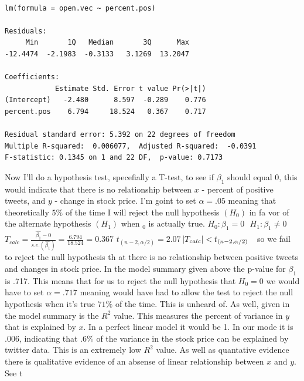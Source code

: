 \documentclass{acm_proc_article-sp}
\begin{document}
\begin{verbatim} 

lm(formula = open.vec ~ percent.pos)

Residuals:
     Min       1Q   Median       3Q      Max 
-12.4474  -2.1983  -0.3133   3.1269  13.2047 

Coefficients:
            Estimate Std. Error t value Pr(>|t|)
(Intercept)   -2.480      8.597  -0.289    0.776
percent.pos    6.794     18.524   0.367    0.717

Residual standard error: 5.392 on 22 degrees of freedom
Multiple R-squared:  0.006077,  Adjusted R-squared:  -0.0391 
F-statistic: 0.1345 on 1 and 22 DF,  p-value: 0.7173

\end{verbatim}

\indent Now I'll do a hypothesis test, specefially a T-test, to see if $\beta_1$ should equal 0, this would indicate
 that there is no relationship between $x$ - percent of positive tweets, and $y$ - change in stock price. I'm goint 
to set $\alpha = .05$ meaning that theoretically $5 \%$ of the time I will reject the null hypothesis $ (H_0)$ in fa
vor of the alternate hypothesis $(H_1)$ when $ _0$ is actually true. 
\newline\indent $ H_0: \beta_1 = 0 \ \ \ H_1: \beta_1 \neq 0$
\newline\indent\large $T_{calc} = \frac{ \hat{\beta_1} - 0 }{s.e.(\hat{\beta_1})} = \frac{6.794}{18.524} = 0.367 $
\newline\indent $ t_{ (n-2,\alpha/2)} = 2.07$
\newline\indent $ \abs{T_{calc}} < t_{ (n-2,\alpha/2)} \ \ $ \normalsize so we fail to reject the null hypothesis th
at there is no relationship between positive tweets and changes in stock price.
\newline\indent In the model summary given above the p-value for $\beta_1$ is .717. This means that for us to reject
 the null hypothesis that $H_0 =0$ we would have to set $\alpha = .717$ meaning would have had to allow the test to 
reject the null hypothesis when it's true $71 \%$ of the time. This is unheard of.
\newline\indent As well, given in the model summary is the $R^2$ value. This measures the percent of variance in $y$
 that is explained by $x$. In a perfect linear model it would be 1. In our mode it is $.006$, indicating that $.6\%$
 of the variance in the stock price can be explained by twitter data. This is an extremely low $R^2$ value. As well 
as quantative evidence there is qualitative evidence of an absense of linear relationship between $x$ and $y$. See t
\end{document}
